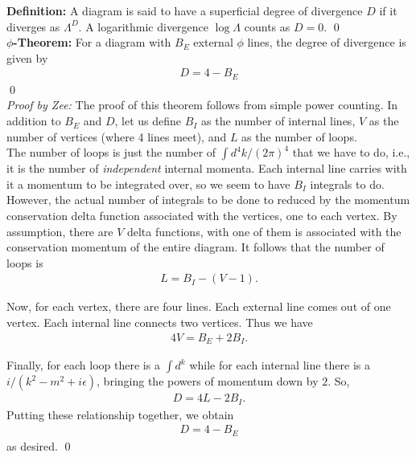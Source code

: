 \documentclass{book}
\theoremstyle{definition}
\begin{document}
\noindent \textbf{Definition:} A diagram is said to have a superficial degree of divergence $D$ if it diverges as $\Lambda^D$. A logarithmic divergence $\log \Lambda$ counts as $D=0$. \qed \\

\noindent \textbf{$\phi$-Theorem:} For a diagram with $B_E$ external $\phi$ lines, the degree of divergence is given by
\begin{align}
\boxed{D = 4 - B_E}
\end{align}\qed \\


\noindent \textit{Proof by Zee:} The proof of this theorem follows from simple power counting. In addition to $B_E$ and $D$, let us define $B_I$ as the number of internal lines, $V$ as the number of vertices (where 4 lines meet), and $L$ as the number of loops. \\

The number of loops is just the number of $\int d^4k/(2\pi)^4$ that we have to do, i.e., it is the number of \textit{independent} internal momenta. Each internal line carries with it a momentum to be integrated over, so we seem to have $B_I$ integrals to do. However, the actual number of integrals to be done to reduced by the momentum conservation delta function associated with the vertices, one to each vertex. By assumption, there are $V$ delta functions, with one of them is associated with the conservation momentum of the entire diagram. It follows that the number of loops is
\begin{align}
L = B_I - (V - 1).
\end{align}


Now, for each vertex, there are four lines. Each external line comes out of one vertex. Each internal line connects two vertices. Thus we have
\begin{align}
4V = B_E + 2B_I.
\end{align}

Finally, for each loop there is a $\int d^k$ while for each internal line there is a $i/(k^2 -m^2 + i\epsilon)$, bringing the powers of momentum down by $2$. So,
\begin{align}
D = 4L - 2B_I.
\end{align}
Putting these relationship together, we obtain
\begin{align}
{D = 4- B_E}
\end{align}
as desired. \qed\\
\end{document}
